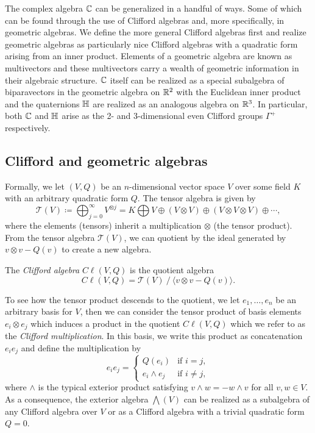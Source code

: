 The complex algebra $\mathbb{C}$ can be generalized in a handful of ways.  Some of which can be found through the use of Clifford algebras and, more specifically, in geometric algebras.  We define the more general Clifford algebras first and realize geometric algebras as particularly nice Clifford algebras with a quadratic form arising from an inner product. Elements of a geometric algebra are known as multivectors and these multivectors carry a wealth of geometric information in their algebraic structure. $\mathbb{C}$ itself can be realized as a special subalgebra of biparavectors in the geometric algebra on $\mathbb{R}^2$ with the Euclidean inner product and the quaternions $\mathbb{H}$ are realized as an analogous algebra on $\mathbb{R}^3$. In particular, both $\mathbb{C}$ and $\mathbb{H}$ arise as the 2- and 3-dimensional even Clifford groups $\Gamma^+$ respectively.

\subsection{Clifford and geometric algebras}

Formally, we let $(V,Q)$ be an $n$-dimensional vector space $V$ over some field $K$ with an arbitrary quadratic form $Q$.  The tensor algebra is given by
\[
\mathcal{T}(V) \coloneqq \bigoplus_{j=0}^\infty V^{\otimes j} = K \bigoplus V \oplus (V\otimes V) \oplus (V\otimes V \otimes V) \oplus \cdots,
\]
where the elements (tensors) inherit a multiplication $\otimes$ (the tensor product). From the tensor algebra $\mathcal{T}(V)$, we can quotient by the ideal generated by $v\otimes v - Q(v)$ to create a new algebra.
\begin{definition}
The \emph{Clifford algebra} $C\ell(V,Q)$ is the quotient algebra
\begin{equation}
C\ell(V,Q) = \mathcal{T}(V) ~ / ~ \langle v \otimes v - Q(v) \rangle.
\end{equation}
\end{definition}
To see how the tensor product descends to the quotient, we let $e_1, \dots, e_n$ be an arbitrary basis for $V$, then we can consider the tensor product of basis elements $e_i \otimes e_j$ which induces a product in the quotient $C\ell(V,Q)$ which we refer to as the \emph{Clifford multiplication}. In this basis, we write this product as concatenation $e_ie_j$ and define the multiplication by
\begin{equation}
\label{eq:clifford_multiplication}
e_i e_j = \begin{cases} Q(e_i) & \textrm{if $i=j$}, \\ e_i \wedge e_j & \textrm{if $i\neq j$},\end{cases}
\end{equation}
where $\wedge$ is the typical exterior product satisfying $v\wedge w = - w\wedge v$ for all $v,w\in V$.  As a consequence, the exterior algebra $\bigwedge(V)$ can be realized as a subalgebra of any Clifford algebra over $V$ or as a Clifford algebra with a trivial quadratic form $Q=0$.  

